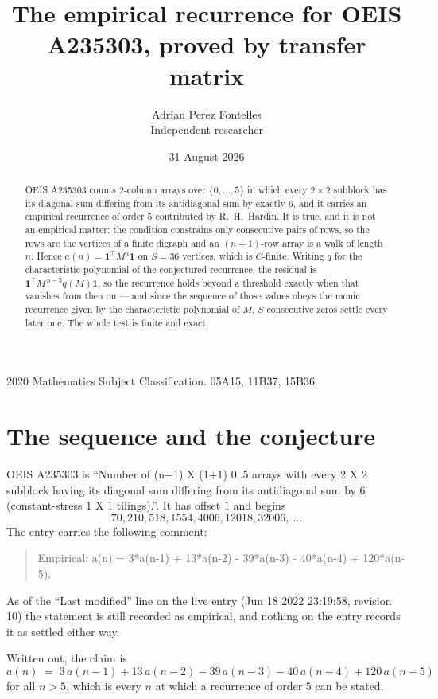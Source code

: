 \documentclass[11pt,a4paper]{article}
\title{The empirical recurrence for OEIS A235303, proved by transfer matrix}
\author{Adrian Perez Fontelles\\ \small Independent researcher}
\date{31 August 2026}
\theoremstyle{plain}
\theoremstyle{definition}
\begin{document}
\maketitle

\begin{abstract}
OEIS A235303 counts $2$-column arrays over $\{0,\dots,5\}$ in which every
$2\times2$ subblock has its diagonal sum differing from its antidiagonal sum by
exactly $6$, and it
carries an empirical recurrence of order $5$ contributed by R.~H.~Hardin. It is true,
and it is not an empirical matter: the condition constrains only consecutive pairs of rows,
so the rows are the vertices of a finite digraph and an $(n+1)$-row array is a walk of
length $n$. Hence $a(n)=\mathbf{1}^{\!\top}M^{n}\mathbf{1}$ on $S=36$ vertices, which
is $C$-finite. Writing $q$ for the characteristic polynomial of the conjectured recurrence,
the residual is $\mathbf{1}^{\!\top}M^{\,n-5}q(M)\mathbf{1}$, so the recurrence
holds beyond a threshold exactly when that vanishes from then on --- and since the sequence
of those values obeys the monic recurrence given by the characteristic polynomial of $M$,
$S$ consecutive zeros settle every later one. The whole test is finite and exact.
\end{abstract}

\noindent\small 2020 Mathematics Subject Classification. 05A15, 11B37, 15B36.\normalsize

\section{The sequence and the conjecture}

OEIS A235303 is ``Number of (n+1) X (1+1) 0..5 arrays with every 2 X 2 subblock having its diagonal sum differing from its antidiagonal sum by 6 (constant-stress 1 X 1 tilings).''. It has offset
$1$ and begins
\[
70, 210, 518, 1554, 4006, 12018, 32006,\ \dots
\]
The entry carries the following comment:
\begin{quote}\small
Empirical: a(n) = 3*a(n-1) + 13*a(n-2) - 39*a(n-3) - 40*a(n-4) + 120*a(n-5).
\end{quote}
As of the ``Last modified'' line on the live entry (Jun 18 2022 23:19:58, revision 10) the statement is
still recorded as empirical, and nothing on the entry records it as settled either way.

Written out, the claim is
\begin{equation}\label{eq:conj}
a(n)\;=\;3\,a(n-1) + 13\,a(n-2) - 39\,a(n-3) - 40\,a(n-4) + 120\,a(n-5)
\end{equation}
for all $n>5$, which is every $n$ at which a recurrence of order $5$ can be
stated.
\end{document}
